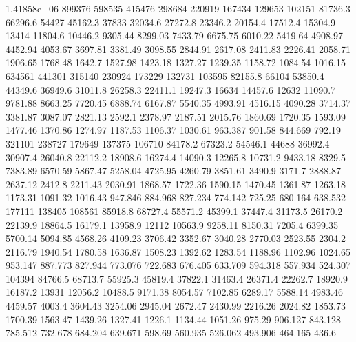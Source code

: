 1.41858e+06      899376      598535      415476      298684      220919      167434      129653      102151      81736.3      66296.6      54427      45162.3      37833      32034.6      27272.8      23346.2      20154.4      17512.4      15304.9      13414      11804.6      10446.2      9305.44      8299.03      7433.79      6675.75      6010.22      5419.64      4908.97      4452.94      4053.67      3697.81      3381.49      3098.55      2844.91      2617.08      2411.83      2226.41      2058.71      1906.65      1768.48      1642.7      1527.98      1423.18      1327.27      1239.35      1158.72      1084.54      1016.15      
634561      441301      315140      230924      173229      132731      103595      82155.8      66104      53850.4      44349.6      36949.6      31011.8      26258.3      22411.1      19247.3      16634      14457.6      12632      11090.7      9781.88      8663.25      7720.45      6888.74      6167.87      5540.35      4993.91      4516.15      4090.28      3714.37      3381.87      3087.07      2821.13      2592.1      2378.97      2187.51      2015.76      1860.69      1720.35      1593.09      1477.46      1370.86      1274.97      1187.53      1106.37      1030.61      963.387      901.58      844.669      792.19      
321101      238727      179649      137375      106710      84178.2      67323.2      54546.1      44688      36992.4      30907.4      26040.8      22112.2      18908.6      16274.4      14090.3      12265.8      10731.2      9433.18      8329.5      7383.89      6570.59      5867.47      5258.04      4725.95      4260.79      3851.61      3490.9      3171.7      2888.87      2637.12      2412.8      2211.43      2030.91      1868.57      1722.36      1590.15      1470.45      1361.87      1263.18      1173.31      1091.32      1016.43      947.846      884.968      827.234      774.142      725.25      680.164      638.532      
177111      138405      108561      85918.8      68727.4      55571.2      45399.1      37447.4      31173.5      26170.2      22139.9      18864.5      16179.1      13958.9      12112      10563.9      9258.11      8150.31      7205.4      6399.35      5700.14      5094.85      4568.26      4109.23      3706.42      3352.67      3040.28      2770.03      2523.55      2304.2      2116.79      1940.54      1780.58      1636.87      1508.23      1392.62      1283.54      1188.96      1102.96      1024.65      953.147      887.773      827.944      773.076      722.683      676.405      633.709      594.318      557.934      524.307      
104394      84766.5      68713.7      55925.3      45819.4      37822.1      31463.4      26371.4      22262.7      18920.9      16187.2      13931      12056.2      10488.5      9171.38      8054.57      7102.85      6289.17      5588.14      4983.46      4459.57      4003.4      3604.43      3254.06      2945.04      2672.47      2430.99      2216.26      2024.82      1853.73      1700.39      1563.47      1439.26      1327.41      1226.1      1134.44      1051.26      975.29      906.127      843.128      785.512      732.678      684.204      639.671      598.69      560.935      526.062      493.906      464.165      436.6      
